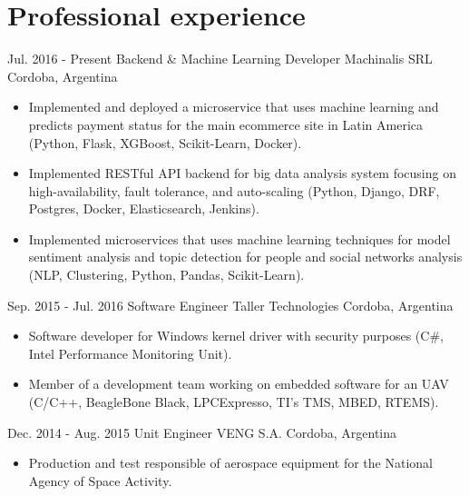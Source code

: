 
\section{Professional experience}

  \cventry
    {Jul. 2016 - Present} %
    {Backend \& Machine Learning Developer} %
    {Machinalis SRL} %
    {Cordoba, Argentina} %
    {}
    {
      \begin{itemize} %
        \item {Implemented and deployed a microservice that uses machine learning and predicts payment status for the main ecommerce site in Latin America (Python, Flask, XGBoost, Scikit-Learn, Docker).}
        \item {Implemented RESTful API backend for big data analysis system focusing on high-availability, fault tolerance, and auto-scaling (Python, Django, DRF, Postgres, Docker, Elasticsearch, Jenkins).}
        \item {Implemented microservices that uses machine learning techniques for model sentiment analysis and topic detection for people and social networks analysis (NLP, Clustering, Python, Pandas, Scikit-Learn).}
      \end{itemize}
    }

  \cventry
    {Sep. 2015 - Jul. 2016} %
    {Software Engineer} %
    {Taller Technologies} %
    {Cordoba, Argentina} %
    {}
    {
      \begin{itemize} %
        \item {Software developer for Windows kernel driver with security purposes (C\#, Intel Performance Monitoring Unit).}
        \item {Member of a development team working on embedded software for an UAV (C/C++, BeagleBone Black, LPCExpresso, TI's TMS, MBED, RTEMS).}
      \end{itemize}
    }

  \cventry
    {Dec. 2014 - Aug. 2015} %
    {Unit Engineer} %
    {VENG S.A.} %
    {Cordoba, Argentina} %
    {}
    {
      \begin{itemize} %
        \item {Production and test responsible of aerospace equipment for the National Agency of Space Activity.}
      \end{itemize}
    }

